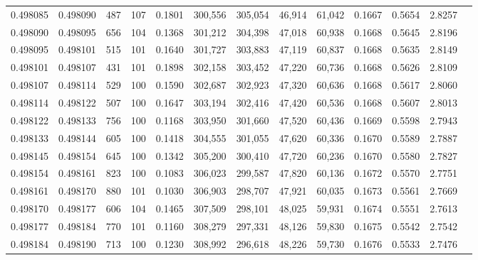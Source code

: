 \begin{tabular}{rrrrrrrrrrrrr}
0.498085 & 0.498090 &   487 & 107 &                                     0.1801 & 300,556 & 305,054 &  46,914 &  61,042 & 0.1667 & 0.5654 & 2.8257 \\
0.498090 & 0.498095 &   656 & 104 &                                     0.1368 & 301,212 & 304,398 &  47,018 &  60,938 & 0.1668 & 0.5645 & 2.8196 \\
0.498095 & 0.498101 &   515 & 101 &                                     0.1640 & 301,727 & 303,883 &  47,119 &  60,837 & 0.1668 & 0.5635 & 2.8149 \\
0.498101 & 0.498107 &   431 & 101 &                                     0.1898 & 302,158 & 303,452 &  47,220 &  60,736 & 0.1668 & 0.5626 & 2.8109 \\
0.498107 & 0.498114 &   529 & 100 &                                     0.1590 & 302,687 & 302,923 &  47,320 &  60,636 & 0.1668 & 0.5617 & 2.8060 \\
0.498114 & 0.498122 &   507 & 100 &                                     0.1647 & 303,194 & 302,416 &  47,420 &  60,536 & 0.1668 & 0.5607 & 2.8013 \\
0.498122 & 0.498133 &   756 & 100 &                                     0.1168 & 303,950 & 301,660 &  47,520 &  60,436 & 0.1669 & 0.5598 & 2.7943 \\
0.498133 & 0.498144 &   605 & 100 &                                     0.1418 & 304,555 & 301,055 &  47,620 &  60,336 & 0.1670 & 0.5589 & 2.7887 \\
0.498145 & 0.498154 &   645 & 100 &                                     0.1342 & 305,200 & 300,410 &  47,720 &  60,236 & 0.1670 & 0.5580 & 2.7827 \\
0.498154 & 0.498161 &   823 & 100 &                                     0.1083 & 306,023 & 299,587 &  47,820 &  60,136 & 0.1672 & 0.5570 & 2.7751 \\
0.498161 & 0.498170 &   880 & 101 &                                     0.1030 & 306,903 & 298,707 &  47,921 &  60,035 & 0.1673 & 0.5561 & 2.7669 \\
0.498170 & 0.498177 &   606 & 104 &                                     0.1465 & 307,509 & 298,101 &  48,025 &  59,931 & 0.1674 & 0.5551 & 2.7613 \\
0.498177 & 0.498184 &   770 & 101 &                                     0.1160 & 308,279 & 297,331 &  48,126 &  59,830 & 0.1675 & 0.5542 & 2.7542 \\
0.498184 & 0.498190 &   713 & 100 &                                     0.1230 & 308,992 & 296,618 &  48,226 &  59,730 & 0.1676 & 0.5533 & 2.7476 \\

\end{tabular}
